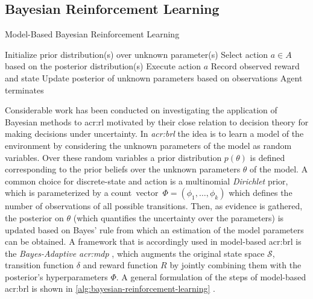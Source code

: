 
\subsection{Bayesian Reinforcement Learning}
\label{sec:bayesian-reinforcement-learning}

\begin{algorithm}[t]
	\caption{Model-Based Bayesian Reinforcement Learning}
	\label{alg:bayesian-reinforcement-learning}
	\begin{algorithmic}[1]
		\State Initialize prior distribution(s) over unknown parameter(s)
		\Repeat
		\State Select action $a \in A$ based on the posterior distribution(s)
		\State Execute action $a$
		\State Record observed reward and state
		\State Update posterior of unknown parameters based on observations
		\Until Agent terminates
	\end{algorithmic}
\end{algorithm}

Considerable work has been conducted on investigating the application of Bayesian methods to \acrshort{acr:rl} motivated by their close relation to decision theory for making decisions under uncertainty. 
In \textit{\acrfull{acr:brl}} \cite{ghavamzadeh2015bayesian} the idea is to learn a model of the environment by considering the unknown parameters of the model as random variables.
Over these random variables a prior distribution $p(\theta)$ is defined corresponding to the prior beliefs over the unknown parameters $\theta$ of the model.
A common choice for discrete-state and action  is a multinomial \textit{Dirichlet} prior, which is parameterized by a count~vector~$\Phi = (\phi_1, \ldots, \phi_k)$ which defines the number of observations of all possible transitions.
Then, as evidence is gathered, the posterior on $\theta$ (which quantifies the uncertainty over the parameters) is updated based on Bayes' rule from which an estimation of the model parameters can be obtained.
A framework that is accordingly used in model-based \acrshort{acr:brl} is the \textit{Bayes-Adaptive \acrshort{acr:mdp}} \cite{guez2012efficient}, which augments the original state space $\mathcal{S}$, transition function $\delta$ and reward function $R$ by jointly combining them with the posterior's hyperparameters $\Phi$.
A general formulation of the steps of model-based \acrshort{acr:brl} is shown in \autoref{alg:bayesian-reinforcement-learning} \cite{png2011bayesian}.

